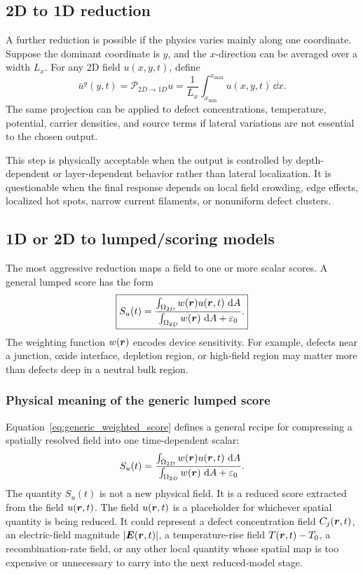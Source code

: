 \documentclass[11pt]{article}
\begin{document}
\subsection{2D to 1D reduction}
A further reduction is possible if the physics varies mainly along one coordinate. Suppose the dominant coordinate is \(y\), and the \(x\)-direction can be averaged over a width \(L_x\). For any 2D field \(u(x,y,t)\), define
\begin{equation}
    \boxed{
    \bar{u}^{y}(y,t)
    =
    \mathcal{P}_{2D\to1D}u
    =
    \frac{1}{L_x}
    \int_{x_{\min}}^{x_{\max}}
    u(x,y,t)\,\dd x.
    }
    \label{eq:2d_to_1d_average}
\end{equation}
The same projection can be applied to defect concentrations, temperature, potential, carrier densities, and source terms if lateral variations are not essential to the chosen output.

This step is physically acceptable when the output is controlled by depth-dependent or layer-dependent behavior rather than lateral localization. It is questionable when the final response depends on local field crowding, edge effects, localized hot spots, narrow current filaments, or nonuniform defect clusters.

\subsection{1D or 2D to lumped/scoring models}
The most aggressive reduction maps a field to one or more scalar scores. A general lumped score has the form
\begin{equation}
    \boxed{
    S_u(t)
    =
    \frac{\int_{\Omega_{2D}} w(\bm{r})u(\bm{r},t)\,\mathop{}\!\mathrm{d} A}
    {\int_{\Omega_{2D}} w(\bm{r})\,\mathop{}\!\mathrm{d} A+\varepsilon_0}.
    }
    \label{eq:generic_weighted_score}
\end{equation}
The weighting function \(w(\bm{r})\) encodes device sensitivity. For example, defects near a junction, oxide interface, depletion region, or high-field region may matter more than defects deep in a neutral bulk region.

\subsubsection{Physical meaning of the generic lumped score}
Equation~\eqref{eq:generic_weighted_score} defines a general recipe for compressing a spatially resolved field into one time-dependent scalar:
\[
    S_u(t)
    =
    \frac{\int_{\Omega_{2D}} w(\bm{r})u(\bm{r},t)\,\mathop{}\!\mathrm{d} A}
    {\int_{\Omega_{2D}} w(\bm{r})\,\mathop{}\!\mathrm{d} A+\varepsilon_0}.
\]
The quantity \(S_u(t)\) is not a new physical field. It is a reduced score extracted from the field \(u(\bm{r},t)\). The field \(u(\bm{r},t)\) is a placeholder for whichever spatial quantity is being reduced. It could represent a defect concentration field \(C_j(\bm{r},t)\), an electric-field magnitude \(\abs{\bm{E}(\bm{r},t)}\), a temperature-rise field \(T(\bm{r},t)-T_0\), a recombination-rate field, or any other local quantity whose spatial map is too expensive or unnecessary to carry into the next reduced-model stage.
\end{document}
